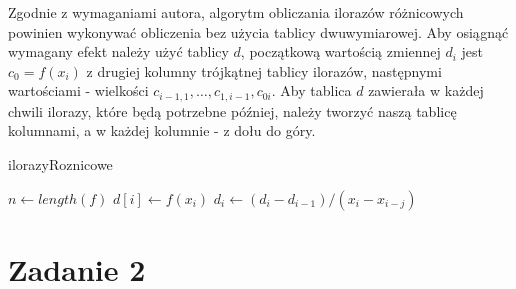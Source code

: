 \documentclass{article}
\begin{document}
\begin{center}
    Zgodnie z wymaganiami autora, algorytm obliczania ilorazów różnicowych powinien wykonywać obliczenia bez użycia tablicy dwuwymiarowej.
    Aby osiągnąć wymagany efekt należy użyć tablicy \(d\), początkową wartością zmiennej \(d_{i}\) jest \(c_{0}=f(x_{i})\) z drugiej kolumny trójkątnej tablicy ilorazów,
    następnymi wartościami - wielkości \(c_{i-1,1},\dots,c_{1,i-1},c_{0i}\). Aby tablica \(d\) zawierała w każdej chwili ilorazy, które będą potrzebne później,
    należy tworzyć naszą tablicę kolumnami, a w każdej kolumnie - z dołu do góry. \newline
    \begin{flushleft}
        \begin{algorithm}
            \caption{ilorazyRoznicowe}\label{alg:ilorazyRoznicowe}
            \begin{algorithmic}
                \State$n \gets length(f)$
                    \State$d[i] \gets f(x_{i})$
                \EndFor
                        \State$d_{i} \gets (d_{i}-d_{i-1})/(x_{i}-x_{i-j})$
                    \EndFor
                \EndFor \newline
                \EndFunction
            \end{algorithmic}
        \end{algorithm}
    \end{flushleft}
    \section{Zadanie 2}

\end{center}
\end{document}
